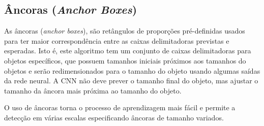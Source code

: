 \subsection{Âncoras (\textit{Anchor Boxes})}
\label{subsec:anchorboxes}

As âncoras (\textit{anchor boxes}), são retângulos de proporções pré-definidas usados para ter maior correspondência entre as caixas delimitadoras previstas e esperadas. Isto é, este algoritmo tem um conjunto de caixas delimitadoras para objetos específicos, que possuem tamanhos iniciais próximos aos tamanhos do objetos e serão redimensionados para o tamanho do objeto usando algumas saídas da rede neural. A CNN não deve prever o tamanho final do objeto, mas ajustar o tamanho da âncora mais próxima ao tamanho do objeto.

O uso de âncoras torna o processo de aprendizagem mais fácil e permite a detecção em várias escalas especificando âncoras de tamanho variados.